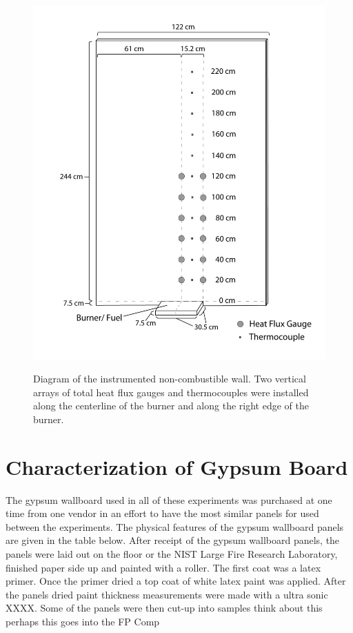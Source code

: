 \documentclass[twoside]{uocthesis}
\begin{document}
{{\begin{figure}
	\centering
	\includegraphics[width=\textwidth]{../Figures/Instrumented_GB_Wall}\\
	\caption[Diagram of the instrumented non-combustible wall]{Diagram of the instrumented non-combustible wall. Two vertical arrays of total heat flux gauges and thermocouples were installed along the centerline of the burner and along the right edge of the burner.}
	\label{Instrumented_GB_Wall}
\end{figure}






\section{Characterization of Gypsum Board}

The gypsum wallboard used in all of these experiments was purchased at one time from one vendor in an effort to have the most similar panels for used between the experiments.  The physical features of the gypsum wallboard panels are given in the table below.   After receipt of the gypsum wallboard panels, the panels were laid out on the floor or the NIST Large Fire Research Laboratory, finished paper side up and painted with a roller.  The first coat was a latex primer.  Once the primer dried a top coat of white latex paint was applied.  After the panels dried paint thickness measurements were made with a ultra sonic XXXX.  Some of the panels were then cut-up into samples think about this perhaps this goes into the FP Comp


}}
\end{document}
